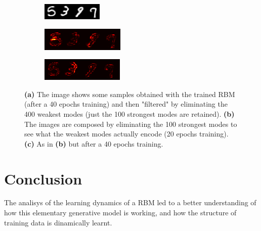 \documentclass{revtex4-1}
\begin{document}
\begin{figure}
  \begin{subfigure}{\linewidth}
  	\centering
    \includegraphics[width=.4\linewidth]{complete40ep.png}
    \caption{}
  \end{subfigure}\par
  \begin{subfigure}{\linewidth}
  	\centering
    \includegraphics[width=.4\linewidth]{difference20ep.png}
    \caption{}  
  \end{subfigure}\par
  \begin{subfigure}{\linewidth}
  	\centering
    \includegraphics[width=.4\linewidth]{difference40ep.png}
    \caption{}
  \end{subfigure}
  \caption{\textbf{(a)} The image shows some samples obtained with the trained RBM (after a 40 epochs training) and then "filtered" by eliminating the 400 weakest modes (just the 100 strongest modes are retained). \textbf{(b)} The images are composed by eliminating the 100 strongest modes to see what the weakest modes actually encode (20 epochs training). \textbf{(c)} As in \textbf{(b)} but after a 40 epochs training.}
  \label{fig:hf_modes}
\end{figure}

\section{Conclusion}

The analisys of the learning dynamics of a RBM led to a better understanding of how this elementary generative model is working, and how the structure of training data is dinamically learnt. 
\end{document}

